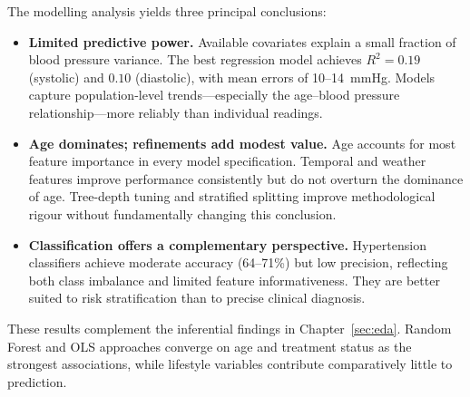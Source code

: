 The modelling analysis yields three principal conclusions:
\begin{itemize}
    \item \textbf{Limited predictive power.} Available covariates explain a small fraction of blood pressure variance. The best regression model achieves $R^2 = 0.19$ (systolic) and $0.10$ (diastolic), with mean errors of 10--14~mmHg. Models capture population-level trends---especially the age--blood pressure relationship---more reliably than individual readings.
    \item \textbf{Age dominates; refinements add modest value.} Age accounts for most feature importance in every model specification. Temporal and weather features improve performance consistently but do not overturn the dominance of age. Tree-depth tuning and stratified splitting improve methodological rigour without fundamentally changing this conclusion.
    \item \textbf{Classification offers a complementary perspective.} Hypertension classifiers achieve moderate accuracy (64--71\%) but low precision, reflecting both class imbalance and limited feature informativeness. They are better suited to risk stratification than to precise clinical diagnosis.
\end{itemize}

These results complement the inferential findings in Chapter~\ref{sec:eda}. Random Forest and OLS approaches converge on age and treatment status as the strongest associations, while lifestyle variables contribute comparatively little to prediction.

